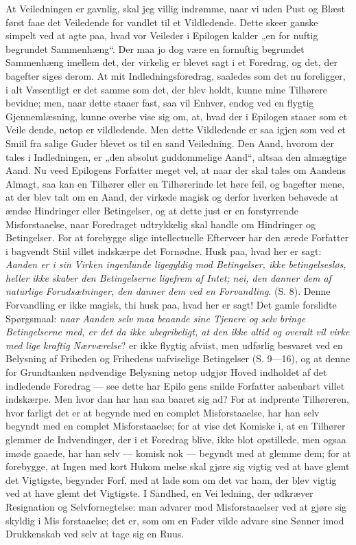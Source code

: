 \documentclass[12pt]{book}
\newcommand{\opage}[1]{\marginnote{\footnotesize\textit{[#1]}}}
\begin{document}
At Veiledningen er gavnlig, skal jeg villig indrømme,
naar vi uden Pust og Blæst først faae det Veiledende for\-%
vandlet til et Vildledende. Dette skeer ganske simpelt ved
at agte paa, hvad vor Veileder i Epilogen kalder „en for\-%
nuftig begrundet Sammenhæng“. Der maa jo dog være en
fornuftig begrundet Sammenhæng imellem det, der virkelig er
blevet sagt i et Foredrag, og det, der bagefter siges derom.
At mit Indledningsforedrag, saaledes som det nu foreligger, i
alt Væsentligt er det samme som det, der blev holdt, kunne
mine Tilhørere bevidne; men, naar dette staaer fast, saa vil
Enhver, endog ved en flygtig Gjennemlæsning, kunne overbe\-%
vise sig om, at, hvad der i Epilogen staaer som et Veile\-%
dende, netop er vildledende. Men dette Vildledende er saa
igjen som ved et Smiil fra salige Guder blevet os til en sand
Veiledning. Den Aand, hvorom der tales i Indledningen, er
„den absolut guddommelige Aand“, altsaa den almægtige
Aand. Nu veed Epilogens Forfatter meget vel, at naar der
skal tales om Aandens Almagt, saa kan en Tilhører eller en
Tilhørerinde let høre feil, og bagefter mene, at der blev talt
om en Aand, der virkede magisk og derfor hverken behøvede
at ændse Hindringer eller Betingelser, og at dette just er en
forstyrrende Misforstaaelse, naar Foredraget udtrykkelig skal
handle om Hindringer og Betingelser. For at forebygge slige
intellectuelle Efterveer har den ærede Forfatter i bagvendt Stiil
villet indskærpe det Fornødne. Husk paa, hvad her er sagt:
\opage{314}\setcounter{footnote}{0}%
\emph{Aanden er i sin Virken ingenlunde ligegyldig mod
Betingelser, ikke betingelsesløs, heller ikke skaber
den Betingelserne ligefrem af Intet; nei, den danner
dem af naturlige Forudsætninger, den danner dem
ved en Forvandling}. (S. 8). Denne Forvandling er ikke
magisk, thi husk paa, hvad her er sagt! Det gamle forslidte
Spørgsmaal: \emph{naar Aanden selv maa beaande sine
Tjenere og selv bringe Betingelserne med, er det
da ikke ubegribeligt, at den ikke altid og overalt
vil virke med lige kraftig Nærværelse}? er ikke flygtig
afviist, men udførlig besvaret ved en Belysning af Friheden
og Frihedens uafviselige Betingelser (S. 9---16), og at denne
for Grundtanken nødvendige Belysning netop udgjør Hoved\-%
indholdet af det indledende Foredrag --- see dette har Epilo\-%
gens snilde Forfatter aabenbart villet indskærpe. Men hvor\-%
dan har han saa baaret sig ad? For at indprente Tilhøreren,
hvor farligt det er at begynde med en complet Misforstaaelse,
har han selv begyndt med en complet Misforstaaelse; for at
vise det Komiske i, at en Tilhører glemmer de Indvendinger,
der i et Foredrag blive, ikke blot opstillede, men ogsaa imøde\-%
gaaede, har han selv --- komisk nok --- begyndt med at
glemme dem; for at forebygge, at Ingen med kort Hukom\-%
melse skal gjøre sig vigtig ved at have glemt det Vigtigste,
begynder Forf. med at lade som om det var ham, der blev
vigtig ved at have glemt det Vigtigste. I Sandhed, en Vei\-%
ledning, der udkræver Resignation og Selvfornegtelse: man
advarer mod Misforstaaelser ved at gjøre sig skyldig i Mis\-%
forstaaelse; det er, som om en Fader vilde advare sine Sønner
imod Drukkenskab ved selv at tage sig en Ruus.
\end{document}
